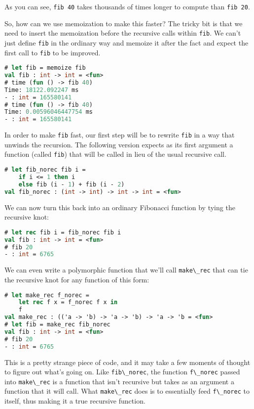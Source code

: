 As you can see, \passthrough{\lstinline!fib 40!} takes thousands of
times longer to compute than \passthrough{\lstinline!fib 20!}.

So, how can we use memoization to make this faster? The tricky bit is
that we need to insert the memoization before the recursive calls within
\passthrough{\lstinline!fib!}. We can't just define
\passthrough{\lstinline!fib!} in the ordinary way and memoize it after
the fact and expect the first call to \passthrough{\lstinline!fib!} to
be improved.

\begin{lstlisting}[language=Caml]
# let fib = memoize fib
val fib : int -> int = <fun>
# time (fun () -> fib 40)
Time: 18122.092247 ms
- : int = 165580141
# time (fun () -> fib 40)
Time: 0.00596046447754 ms
- : int = 165580141
\end{lstlisting}

In order to make \passthrough{\lstinline!fib!} fast, our first step will
be to rewrite \passthrough{\lstinline!fib!} in a way that unwinds the
recursion. The following version expects as its first argument a
function (called \passthrough{\lstinline!fib!}) that will be called in
lieu of the usual recursive call.

\begin{lstlisting}[language=Caml]
# let fib_norec fib i =
    if i <= 1 then i
    else fib (i - 1) + fib (i - 2)
val fib_norec : (int -> int) -> int -> int = <fun>
\end{lstlisting}

We can now turn this back into an ordinary Fibonacci function by tying
the recursive knot:

\begin{lstlisting}[language=Caml]
# let rec fib i = fib_norec fib i
val fib : int -> int = <fun>
# fib 20
- : int = 6765
\end{lstlisting}

We can even write a polymorphic function that we'll call
\passthrough{\lstinline!make\_rec!} that can tie the recursive knot for
any function of this form:

\begin{lstlisting}[language=Caml]
# let make_rec f_norec =
    let rec f x = f_norec f x in
    f
val make_rec : (('a -> 'b) -> 'a -> 'b) -> 'a -> 'b = <fun>
# let fib = make_rec fib_norec
val fib : int -> int = <fun>
# fib 20
- : int = 6765
\end{lstlisting}

This is a pretty strange piece of code, and it may take a few moments of
thought to figure out what's going on. Like
\passthrough{\lstinline!fib\_norec!}, the function
\passthrough{\lstinline!f\_norec!} passed into
\passthrough{\lstinline!make\_rec!} is a function that isn't recursive
but takes as an argument a function that it will call. What
\passthrough{\lstinline!make\_rec!} does is to essentially feed
\passthrough{\lstinline!f\_norec!} to itself, thus making it a true
recursive function.

